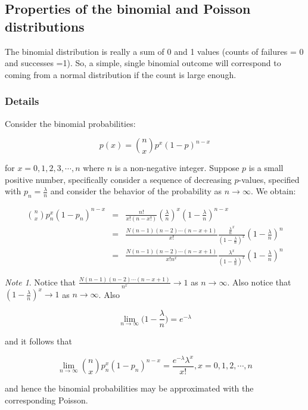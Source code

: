 \documentclass[12pt,a4paper]{article}
\theoremstyle{regla}
\theoremstyle{remark}
\newtheorem{notes}{Note}[section]
\theoremstyle{definition}
\theoremstyle{nonumberbreak}
\begin{document}
\subsection{Properties of the binomial and Poisson distributions}
\begin{fbox}
\begin{minipage}{0.97\textwidth}
The binomial distribution is really a sum of 0 and 1 values (counts of failures = 0 and successes =1). So, a simple, single binomial outcome will correspond to coming from a normal distribution if the count is large enough.
\end{minipage}
\end{fbox}
\subsubsection{Details}
Consider the binomial probabilities:

$$p(x)=\binom{n}{x}p^x(1-p)^{n-x}$$

for $x=0,1,2,3, \cdots,n$ where $n$ is a non-negative integer.  Suppose $p$ is a small positive number, specifically consider a sequence of decreasing $p$-values, specified with $p_n= \frac{\lambda}{n}$ and consider the behavior of the probability as $n \rightarrow \infty$. We obtain:

\begin{eqnarray}
\binom{n}{x}p_n^x(1-p_n)^{n-x}& = &\frac{n!}{x!(n-x!)} \left ( \frac{\lambda}{n} \right )^x \left ( 1-\frac{\lambda}{n} \right )^{n-x}\\
& = &\frac{N(n-1)(n-2)\cdots (n-x+1)}{x!} \frac{\frac{\lambda}{n}^x}{\left ( 1-\frac{\lambda}{n} \right ) ^x} \left ( 1-\frac{\lambda}{n} \right )^n\\
& = &\frac{N(n-1)(n-2)\cdots (n-x+1)}{x!n^x} \frac{\lambda^x}{\left ( 1-\frac{\lambda}{n} \right ) ^x} \left ( 1-\frac{\lambda}{n} \right )^n
\end{eqnarray}
\begin{notes}
Notice that $\frac{N(n-1)(n-2)\cdots (n-x+1)}{n^x}\to 1$ as $n\to\infty$. Also notice that $(1-\frac{\lambda}{n})^x\to 1$ as $n\to\infty$. Also

$$\lim_{n \to \infty} \bigg( 1-\frac{\lambda}{n} \bigg) = e^{- \lambda}$$

 

and it follows that

$$ \lim_{n \to \infty} \binom{n}{x}p_n^x(1-p_n)^{n-x} = \frac{e^{- \lambda} \lambda^x}{x!}, x= 0,1,2, \cdots , n $$

and hence the binomial probabilities may be approximated with the corresponding Poisson.   
\end{notes}
\end{document}
